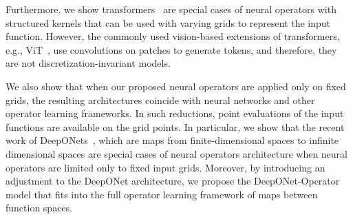 

Furthermore, we show transformers~\citep{vaswani2017attention} are special cases of neural operators with structured kernels that can be used with varying grids to represent the input function. However, the commonly used vision-based extensions of transformers, e.g., ViT~\citep{dosovitskiy2020image}, use convolutions on patches  to generate tokens, and therefore, they are not discretization-invariant models.


We also show that when our proposed neural operators are  applied only on fixed grids, the resulting architectures coincide with neural networks and other operator learning frameworks. In such reductions, point evaluations of the input functions are available on the grid points. In particular, we show that the recent work of DeepONets~\citep{lu2019deeponet}, which are maps from finite-dimensional spaces to infinite dimensional spaces are special cases of neural operators architecture when neural operators are limited only to fixed input grids. Moreover, by introducing an adjustment to the DeepONet architecture, we propose the DeepONet-Operator model that fits into the full operator learning framework of maps between function spaces. 






